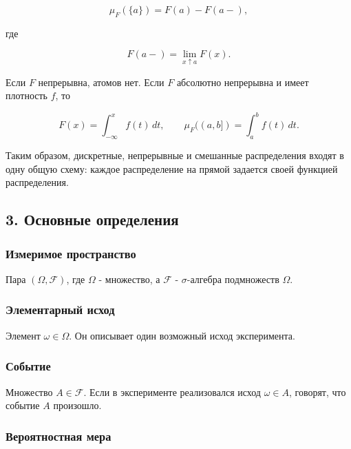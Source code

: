 \documentclass[
  11pt,
  a4paper,
]{article}
\begin{document}
\[
\mu_F(\{a\})=F(a)-F(a-),
\]

где

\[
F(a-)=\lim_{x\uparrow a}F(x).
\]

Если \(F\) непрерывна, атомов нет. Если \(F\) абсолютно непрерывна и
имеет плотность \(f\), то

\[
F(x)=\int_{-\infty}^{x} f(t)\,dt,\qquad
\mu_F((a,b])=\int_a^b f(t)\,dt.
\]

Таким образом, дискретные, непрерывные и смешанные распределения входят
в одну общую схему: каждое распределение на прямой задается своей
функцией распределения.

\subsection{3. Основные
определения}\label{ux43eux441ux43dux43eux432ux43dux44bux435-ux43eux43fux440ux435ux434ux435ux43bux435ux43dux438ux44f}

\subsubsection{Измеримое
пространство}\label{ux438ux437ux43cux435ux440ux438ux43cux43eux435-ux43fux440ux43eux441ux442ux440ux430ux43dux441ux442ux432ux43e}

Пара \((\Omega,\mathcal F)\), где \(\Omega\) - множество, а
\(\mathcal F\) - \(\sigma\)-алгебра подмножеств \(\Omega\).

\subsubsection{Элементарный
исход}\label{ux44dux43bux435ux43cux435ux43dux442ux430ux440ux43dux44bux439-ux438ux441ux445ux43eux434}

Элемент \(\omega\in\Omega\). Он описывает один возможный исход
эксперимента.

\subsubsection{Событие}\label{ux441ux43eux431ux44bux442ux438ux435}

Множество \(A\in\mathcal F\). Если в эксперименте реализовался исход
\(\omega\in A\), говорят, что событие \(A\) произошло.

\subsubsection{Вероятностная
мера}\label{ux432ux435ux440ux43eux44fux442ux43dux43eux441ux442ux43dux430ux44f-ux43cux435ux440ux430}
\end{document}
